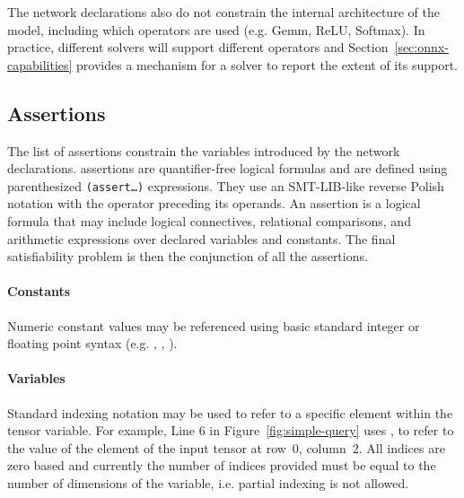 The network declarations also do not constrain the internal architecture of the model, including which operators  are used (e.g. Gemm, ReLU, Softmax). In practice, different solvers will support different operators and Section~\ref{sec:onnx-capabilities} provides a mechanism for a solver to report the extent of its support.


\subsection{Assertions}

The list of assertions constrain the variables introduced by the network declarations. \vnnlib{} assertions are quantifier-free logical formulas and are defined using parenthesized \texttt{(assert\ldots)} expressions. 
They use an SMT-LIB-like reverse Polish notation with the operator preceding its operands.
An assertion is a logical formula that may include logical connectives, relational comparisons, and arithmetic expressions over declared variables and constants.
The final satisfiability problem is then the conjunction of all the assertions.
 
\paragraph{Constants}

Numeric constant values may be referenced using basic standard integer or floating point syntax (e.g. , , ). 

\paragraph{Variables} 

Standard indexing notation may be used to refer to a specific element within the tensor variable. For example, Line 6 in Figure~\ref{fig:simple-query} uses , to refer to the value of the element of the input tensor at row~0, column~2. All indices are zero based and currently the number of indices provided must be equal to the number of dimensions of the variable, i.e. partial indexing is not allowed.

